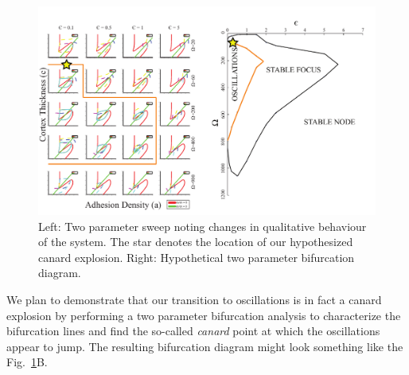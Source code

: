 \begin{figure}[h]
\centering
\captionsetup{width=\linewidth}
\includegraphics[width=7in]{Project2/figs/bifurcationdiagrams.pdf}
\caption{Left: Two parameter sweep noting changes in qualitative behaviour of the system. The star denotes the location of our hypothesized canard explosion. Right: Hypothetical two parameter bifurcation diagram.}
\label{fig::epsomega}
\end{figure}
 
We plan to demonstrate that our transition to oscillations is in fact a canard explosion by performing a two parameter bifurcation analysis to characterize the bifurcation lines and find the so-called {\textit{canard}} point at which the oscillations appear to jump. The resulting bifurcation diagram might look something like the Fig.~\ref{fig::epsomega}B. 


